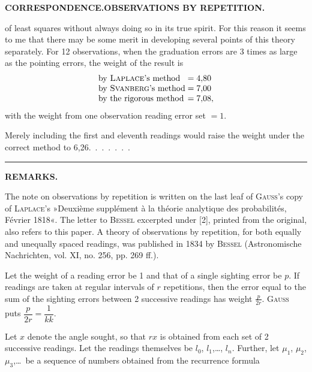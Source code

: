 \par\clearpage
\noindent{}\hfill{\small\textbf{CORRESPONDENCE.\quad OBSERVATIONS BY REPETITION.}}\hfill\null\par\medskip
\noindent of least squares without always doing so in its true spirit. For this reason it seems to me that there may be some merit in developing several points of this theory separately. For 12 observations, when the graduation errors are 3 times as large as the pointing errors, the weight of the result is
\[
\begin{array}{l@{\;}c@{\;}l}
\text{by \textsc{Laplace}'s method}&=&4{,}80\\
\text{by \textsc{Svanberg}'s method}&=&7{,}00\\
\text{by the rigorous method}&=&7{,}08,
\end{array}
\]
\noindent with the weight from one observation  reading error set $=1$.
\par\noindent\hspace*{\parindent}Merely including the first and eleventh readings would raise the weight under the correct method to 6,26.\ .\ .\ .\ .\ .\ .
\begin{center}\rule{2.7cm}{.4pt}\end{center}
\begingroup\small
\begin{center}\textbf{REMARKS.}\end{center}
\par\noindent\hspace*{\parindent}The note on observations by repetition is written on the last leaf of \textsc{Gauss}'s copy of \textsc{Laplace}'s »Deuxième supplément à la théorie analytique des probabilités, Février 1818«. The letter to \textsc{Bessel} excerpted under [2], printed from the original, also refers to this paper. A theory of observations by repetition, for both equally and unequally spaced readings, was published in 1834 by \textsc{Bessel} (Astronomische Nachrichten, vol. XI, no. 256, pp. 269 ff.).
\par\noindent\hspace*{\parindent}Let the weight of a reading error be 1 and that of a single sighting error be $p$. If readings are taken at regular intervals of $r$ repetitions, then the error equal to the sum of the sighting errors between 2 successive readings has weight $\frac{p}{2r}$. \textsc{Gauss} puts $\dfrac{p}{2r}=\dfrac1{kk}$.
\par\noindent\hspace*{\parindent}Let $x$ denote the angle sought, so that $rx$ is obtained from each set of 2 successive readings. Let the readings themselves be $l_0$, $l_1$,\ldots, $l_n$. Further, let $\mu_1$, $\mu_2$, $\mu_3$,\ldots\ be a sequence of numbers obtained from the recurrence formula
